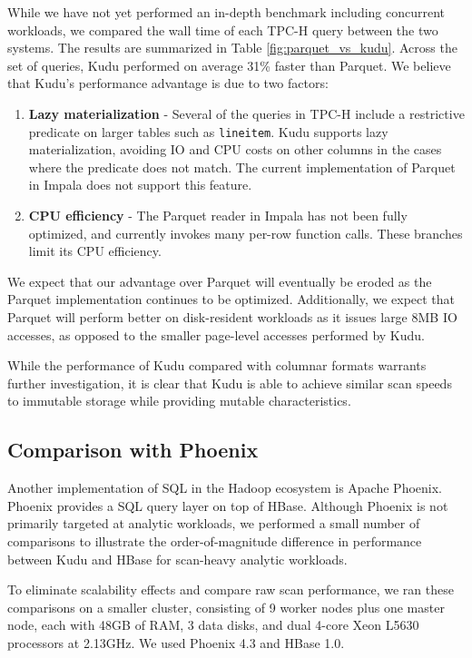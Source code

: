 \documentclass{vldb}
\begin{document}
While we have not yet performed an in-depth benchmark including concurrent workloads, we compared
the wall time of each TPC-H query between the two systems. The results are summarized in Table \ref{fig:parquet_vs_kudu}.
Across the set of queries, Kudu performed on average 31\% faster than Parquet. We believe that Kudu's performance
advantage is due to two factors:
\begin{enumerate}
\item {\bf Lazy materialization} - Several of the queries in TPC-H include a restrictive predicate
  on larger tables such as {\tt lineitem}. Kudu supports lazy materialization, avoiding IO and
  CPU costs on other columns in the cases where the predicate does not match. The current
  implementation of Parquet in Impala does not support this feature.
\item {\bf CPU efficiency} - The Parquet reader in Impala has not been fully optimized,
  and currently invokes many per-row function calls. These branches limit its CPU efficiency.
\end{enumerate}

We expect that our advantage over Parquet will eventually be eroded as the Parquet implementation
continues to be optimized. Additionally, we expect that Parquet will perform better on disk-resident
workloads as it issues large 8MB IO accesses, as opposed to the smaller page-level accesses performed by Kudu.

While the performance of Kudu compared with columnar formats warrants further investigation, it is clear that
Kudu is able to achieve similar scan speeds to immutable storage while providing mutable characteristics.

\subsection{Comparison with Phoenix}
\label{sec:phoenix}

Another implementation of SQL in the Hadoop ecosystem is Apache Phoenix\cite{phoenix}. Phoenix
provides a SQL query layer on top of HBase. Although Phoenix is not primarily
targeted at analytic workloads, we performed a small number of comparisons to illustrate the
order-of-magnitude difference in performance between Kudu and HBase for scan-heavy analytic
workloads.

To eliminate scalability effects and compare raw scan performance, we ran these comparisons on
a smaller cluster, consisting of 9 worker nodes plus one master node, each with
48GB of RAM, 3 data disks, and dual 4-core Xeon L5630 processors at 2.13GHz.
We used Phoenix 4.3 and HBase 1.0.
\end{document}
